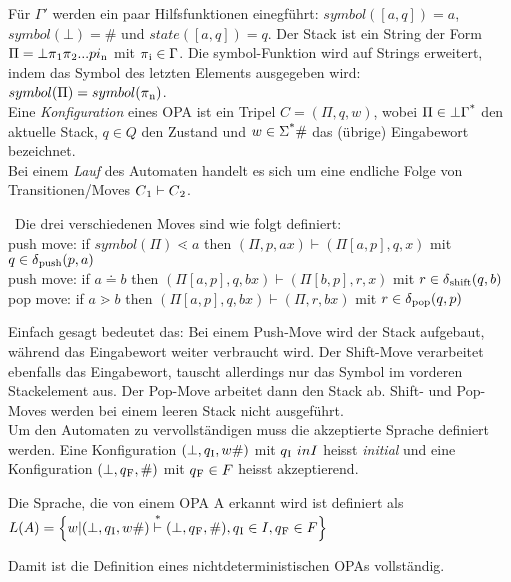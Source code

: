 Für $\Gamma ' $ werden ein paar Hilfsfunktionen einegführt: $symbol(\left[ a, q \right]) = a$, $symbol(\bot) = \#$ und $state(\left[ a, q \right]) = q$. Der Stack ist ein String der Form $\Pi = \bot \pi \textsubscript{1} \pi \textsubscript{2}... pi\textsubscript{n}$ mit $\pi\textsubscript{i}\in \Gamma$. Die symbol-Funktion wird auf Strings erweitert, indem das Symbol des letzten Elements ausgegeben wird: $symbol(\Pi)=symbol(\pi \textsubscript{n})$.\\
Eine \textit{Konfiguration} eines OPA ist ein Tripel $C = (\Pi, q, w)$, wobei $\Pi \in \bot \Gamma \textsuperscript{*}$ den aktuelle Stack, $q \in Q$ den Zustand und $w \in \Sigma\textsuperscript{*}\#$ das (übrige) Eingabewort bezeichnet.\\
Bei einem \textit{Lauf} des Automaten handelt es sich um eine endliche Folge von Transitionen/Moves $C\textsubscript{1} \vdash C\textsubscript{2}$. 
\begin{definition}[Übergangsfunktionen]\ Die drei verschiedenen Moves sind wie folgt definiert: \\[1ex]
push move: if $symbol(\Pi) \lessdot a $ then $ (\Pi, p, ax) \vdash (\Pi\left[a, p \right], q, x)$ mit $q \in \delta\textsubscript{push}(p,a)$\\[0.5ex]  
push move: if $a \doteq b $ then $ (\Pi\left[a, p \right], q, bx) \vdash (\Pi\left[b, p \right], r, x)$ mit $r \in \delta \textsubscript{shift}(q,b)$\\[0.5ex]
pop move: if $a \gtrdot b $ then $ (\Pi\left[a, p \right], q, bx) \vdash (\Pi, r, bx)$ mit $r \in \delta \textsubscript{pop}(q,p)$
\end{definition}
Einfach gesagt bedeutet das: Bei einem Push-Move wird der Stack aufgebaut, während das Eingabewort weiter verbraucht wird. Der Shift-Move verarbeitet ebenfalls das Eingabewort, tauscht allerdings nur das Symbol im vorderen Stackelement aus. Der Pop-Move arbeitet dann den Stack ab. Shift- und Pop-Moves werden bei einem leeren Stack nicht ausgeführt.\\
Um den Automaten zu vervollständigen muss die akzeptierte Sprache definiert werden. Eine Konfiguration $(\bot, q\textsubscript{I}, w\#)$ mit $q\textsubscript{I} \ in I$ heisst \textit{initial} und eine Konfiguration $(\bot, q\textsubscript{F}, \#)$ mit $q\textsubscript{F} \in F$ heisst akzeptierend.
\begin{definition}
Die Sprache, die von einem OPA A erkannt wird ist definiert als\\
$L(A)=  \Big \{ w | (\bot, q\textsubscript{I}, w\#) \overset{*}{\vdash} (\bot, q \textsubscript{F},\#), q\textsubscript{I} \in I, q \textsubscript{F} \in F \Big \}$
\end{definition}
Damit ist die Definition eines nichtdeterministischen OPAs vollständig.
